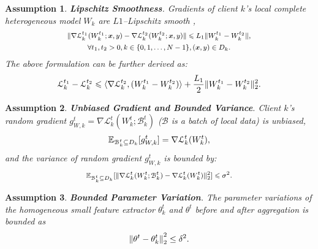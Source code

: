 \documentclass[sigconf]{acmart}
\newtheorem{assumption}{Assumption}
\newcommand{\homo}{homogeneous }
\begin{document}
\begin{assumption}\label{assump:Lipschitz}
\textbf{Lipschitz Smoothness}. Gradients of client $k$'s local complete heterogeneous model $W_k$ are $L1$--Lipschitz smooth \cite{FedProto},
\begin{equation}\label{eq:smmoth}
\footnotesize
\begin{gathered}
\|\nabla \mathcal{L}_k^{t_1}(W_k^{t_1} ; \boldsymbol{x}, y)-\nabla \mathcal{L}_k^{t_2}(W_k^{t_2} ; \boldsymbol{x}, y)\| \leqslant L_1\|W_k^{t_1}-W_k^{t_2}\|, \\
\forall t_1, t_2>0, k \in\{0,1, \ldots, N-1\},(\boldsymbol{x}, y) \in D_k.
\end{gathered}
\end{equation}
The above formulation can be further derived as:
\begin{equation}
\footnotesize
\mathcal{L}_k^{t_1}-\mathcal{L}_k^{t_2} \leqslant\langle\nabla \mathcal{L}_k^{t_2},(W_k^{t_1}-W_k^{t_2})\rangle+\frac{L_1}{2}\|W_k^{t_1}-W_k^{t_2}\|_2^2 .
\end{equation}
\end{assumption}

\begin{assumption} \label{assump:Unbiased}
\textbf{Unbiased Gradient and Bounded Variance}. Client $k$'s random gradient $g_{W,k}^t=\nabla \mathcal{L}_k^t(W_k^t; \mathcal{B}_k^t)$ ($\mathcal{B}$ is a batch of local data) is unbiased, 
\begin{equation}
\footnotesize
\mathbb{E}_{\mathcal{B}_k^t \subseteq D_k}[g_{W,k}^t]=\nabla \mathcal{L}_k^t(W_k^t),
\end{equation}
and the variance of random gradient $g_{W,k}^t$ is bounded by:
\begin{equation}
\footnotesize
\begin{split}
\mathbb{E}_{\mathcal{B}_k^t \subseteq D_k}[\|\nabla \mathcal{L}_k^t(W_k^t ; \mathcal{B}_k^t)-\nabla \mathcal{L}_k^t(W_k^t)\|_2^2] \leqslant \sigma^2.
\end{split}
\end{equation}    
\end{assumption} 



\begin{assumption} \label{assump:BoundedVariation}
\textbf{Bounded Parameter Variation}. The parameter variations of the \homo small feature extractor $\theta_k^t$ and $\theta^t$ before and after aggregation is bounded as
\begin{equation}
\footnotesize
     {\|\theta^t - \theta_k^{t}\|}_2^2 \leq \delta^2.
\end{equation}
\end{assumption} 
\end{document}

